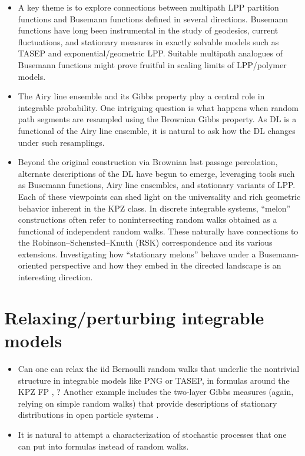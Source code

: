 \documentclass{article}
\theoremstyle{definition}
\begin{document}
\begin{itemize}
    \item 
    A key theme is to explore connections between multipath LPP 
		partition functions
		and Busemann functions defined in several directions. 
		Busemann functions have long been instrumental in the study of geodesics, current fluctuations, and stationary measures in exactly solvable models such as TASEP and exponential/geometric LPP.
		Suitable multipath analogues of Busemann functions might prove fruitful in scaling limits of 
		LPP/polymer models.
		
    \item
			The Airy line ensemble and its Gibbs property \cite{corwin2014brownian} play a central role in integrable probability. 
			One intriguing question is what happens when random path
			segments are resampled using the Brownian Gibbs property.
			As DL is a functional of the Airy line ensemble, it is
			natural to ask how the DL changes under such resamplings.
    
    \item 
    Beyond the original construction via Brownian last passage percolation, alternate descriptions of the DL have begun to emerge, leveraging tools such as Busemann functions, Airy line ensembles, and stationary variants of LPP. 
		Each of these viewpoints can shed light on the universality and rich geometric behavior inherent in the KPZ class.
    In discrete integrable systems, ``melon'' constructions often refer to nonintersecting
		random walks obtained as a functional of independent random walks.
		These naturally have connections to the Robinson–Schensted–Knuth (RSK) correspondence and its various extensions.
		Investigating how ``stationary melons'' behave under a
		Busemann-oriented perspective and how they embed in the
		directed landscape is an interesting direction.
\end{itemize}


\section{Relaxing/perturbing integrable models}
\begin{itemize}
	\item 
    Can one can relax the iid Bernoulli random walks that underlie 
		the nontrivial structure in integrable models like PNG or TASEP,
		in formulas around the KPZ FP \cite{matetski2017kpz}, \cite{matetski2022polynuclear}?
		Another example includes the 
		two-layer Gibbs measures (again, relying on simple random walks) that provide
		descriptions of stationary distributions in open particle systems
		\cite{BarraquandCorwinYang2023}.

    \item 
    It is natural to attempt a characterization of 
		stochastic processes that one can put into 
		formulas instead of random walks.
\end{itemize}
\end{document}
